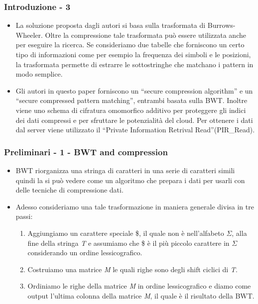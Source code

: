 \documentclass{beamer}
\begin{document}
\begin{frame}
\frametitle{Introduzione - 3}
	\begin{itemize}
		\item La soluzione proposta dagli autori si basa sulla trasformata di Burrows-Wheeler. Oltre la compressione tale trasformata può essere utilizzata anche per eseguire la ricerca. Se consideriamo due tabelle che forniscono un certo tipo di informazioni come per esempio la frequenza dei simboli e le posizioni, la trasformata permette di estrarre le sottostringhe che matchano i pattern in modo semplice.
		\pause
		\item Gli autori in questo paper forniscono un ``secure compression algorithm'' e un “secure compressed pattern matching”, entrambi basata sulla BWT. Inoltre viene uno schema di cifratura omomorfico additivo per proteggere gli indici dei dati compressi e per sfruttare le potenzialità del cloud. Per ottenere i dati dal server viene utilizzato il ``Private Information Retrival Read''(PIR\_Read).
		
	\end{itemize}
\end{frame}
\begin{frame}
\frametitle{Preliminari - 1 - BWT and compression}
	\begin{itemize}
	 \item BWT riorganizza una stringa di caratteri in una serie di caratteri simili quindi la si può vedere come un algoritmo che prepara i dati per usarli con delle tecniche di compressione dati.\pause
	 \item Adesso consideriamo una tale trasformazione in maniera generale divisa in tre passi:\pause
	 \begin{enumerate}
	 	\item Aggiungiamo un carattere speciale \$, il quale non è nell'alfabeto $\Sigma$, alla fine della stringa \textit{T} e assumiamo che \$ è il più piccolo carattere in $\Sigma$ considerando un ordine lessicografico.\pause
	 	\item Costruiamo una matrice \textit{M} le quali righe sono degli shift ciclici di \textit{T}.\pause
	 	\item Ordiniamo le righe della matrice \textit{M} in ordine lessicografico e diamo come output l’ultima colonna della matrice \textit{M}, il quale è il risultato della BWT.	\pause
	 \end{enumerate}
	\end{itemize}
\end{frame}
\end{document}
